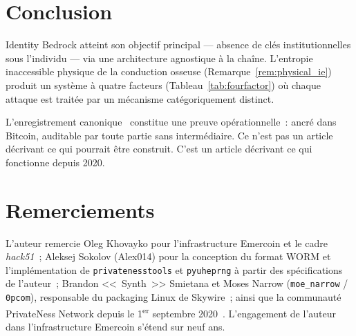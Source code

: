 \documentclass[11pt,a4paper]{article}
\theoremstyle{definition}
\newcommand{\BD}{\textsf{Identity Bedrock}}
\begin{document}
\section*{Conclusion}

\BD{} atteint son objectif principal --- absence de clés
institutionnelles sous l'individu --- via une architecture agnostique
à la chaîne. L'entropie inaccessible physique de la conduction
osseuse (Remarque~\ref{rem:physical_ie}) produit un système à quatre
facteurs (Tableau~\ref{tab:fourfactor}) où chaque attaque est traitée
par un mécanisme catégoriquement distinct.

L'enregistrement canonique~\cite{DPO} constitue une preuve
opérationnelle~: ancré dans Bitcoin, auditable par toute partie
sans intermédiaire. Ce n'est pas un article décrivant ce qui
pourrait être construit. C'est un article décrivant ce qui fonctionne
depuis 2020.

\section*{Remerciements}

L'auteur remercie Oleg Khovayko pour l'infrastructure Emercoin et
le cadre \emph{hack51}~; Aleksej Sokolov (Alex014) pour la
conception du format WORM et l'implémentation de
\texttt{privatenesstools} et \texttt{pyuheprng} à partir des
spécifications de l'auteur~; Brandon <<~Synth~>> Smietana et Moses
Narrow (\texttt{moe\_narrow} / \texttt{0pcom}), responsable du
packaging Linux de Skywire~; ainsi que la communauté PrivateNess
Network depuis le 1\textsuperscript{er} septembre 2020~\cite{BTCTalk20}.
L'engagement de l'auteur dans l'infrastructure Emercoin s'étend sur
neuf ans.
\end{document}
